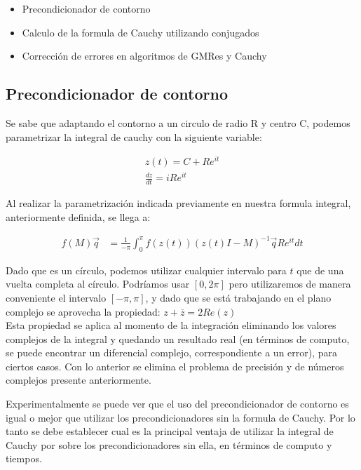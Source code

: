\documentclass[fleqn]{article}
\begin{document}
\begin{itemize}
\item Precondicionador de contorno
\item Calculo de la formula de Cauchy utilizando conjugados
\item Corrección de errores en algoritmos de GMRes y Cauchy
\end{itemize}

\subsection{Precondicionador de contorno}
Se sabe\cite{2} que adaptando el contorno a un circulo de radio R y centro C, podemos parametrizar la integral de cauchy con la siguiente variable:

\begin{align*}
    z(t)= C + Re^{it}\\
    \displaystyle{\frac{dz}{dt}} = iRe^{it}
\end{align*}

Al realizar la parametrización indicada previamente en nuestra formula integral, anteriormente definida, se llega a:

\begin{align*}
f(M)\vec{q} &= \frac{1}{-\pi} \int_{0}^{\pi} f(z(t))(z(t)I - M)^{-1}\vec{q}Re^{it}dt
\end{align*}

Dado que es un círculo, podemos utilizar cualquier intervalo para $t$ que de una vuelta completa al círculo. Podríamos usar $[0, 2\pi]$ pero utilizaremos de manera conveniente el intervalo $[-\pi,\pi]$, y dado que se está trabajando en el plano complejo se aprovecha la propiedad: $z + \overline{z} = 2Re(z)$\\
Esta propiedad se aplica al momento de la integración eliminando los valores complejos de la integral y quedando un resultado real (en términos de computo, se puede encontrar un diferencial complejo, correspondiente a un error), para ciertos casos. Con lo anterior se elimina el problema de precisión y de números complejos presente anteriormente.


Experimentalmente se puede ver que el uso del precondicionador de contorno es igual o mejor que utilizar los precondicionadores sin la formula de Cauchy. Por lo tanto se debe establecer cual es la principal ventaja de utilizar la integral de Cauchy por sobre los precondicionadores sin ella, en términos de computo y tiempos.








\end{document}
